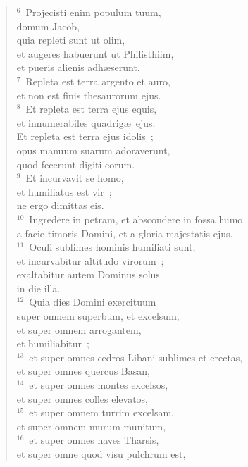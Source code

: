 \begin{flushleft}\begin{verse}${}^{6}$~Projecisti enim populum tuum,\\ domum Jacob,\\ quia repleti sunt ut olim,\\ et augeres habuerunt ut Philisthiim,\\ et pueris alienis adh\ae serunt.\\
${}^{7}$~Repleta est terra argento et auro,\\ et non est finis thesaurorum ejus.\\
${}^{8}$~Et repleta est terra ejus equis,\\ et innumerabiles quadrig\ae\ ejus.\\ Et repleta est terra ejus idolis~;\\ opus manuum suarum adoraverunt,\\ quod fecerunt digiti eorum.\\
${}^{9}$~Et incurvavit se homo,\\ et humiliatus est vir~;\\ ne ergo dimittas eis.\\
${}^{10}$~Ingredere in petram, et abscondere in fossa humo\\ a facie timoris Domini, et a gloria majestatis ejus.\\
${}^{11}$~Oculi sublimes hominis humiliati sunt,\\ et incurvabitur altitudo virorum~;\\ exaltabitur autem Dominus solus\\ in die illa.\\
${}^{12}$~Quia dies Domini exercituum\\ super omnem superbum, et excelsum,\\ et super omnem arrogantem,\\ et humiliabitur~;\\
${}^{13}$~et super omnes cedros Libani sublimes et erectas,\\ et super omnes quercus Basan,\\
${}^{14}$~et super omnes montes excelsos,\\ et super omnes colles elevatos,\\
${}^{15}$~et super omnem turrim excelsam,\\ et super omnem murum munitum,\\
${}^{16}$~et super omnes naves Tharsis,\\ et super omne quod visu pulchrum est,\\

\end{verse}
\end{flushleft}
